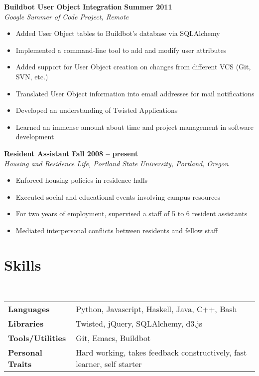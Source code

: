 \documentclass[margin,line]{resume}
\begin{document}
\begin{resume}
    \textbf{Buildbot User Object Integration} \hfill \textbf{Summer 2011} \vspace{2mm}\\\vspace{1mm}%
    \textsl{Google Summer of Code Project, Remote}
    \begin{itemize}
        \item Added User Object tables to Buildbot's database via SQLAlchemy
        \item Implemented a command-line tool to add and modify user attributes
        \item Added support for User Object creation on changes from different VCS (Git, SVN, etc.)
        \item Translated User Object information into email addresses for mail notifications
        \item Developed an understanding of Twisted Applications
        \item Learned an immense amount about time and project management in software development
    \end{itemize}

    \textbf{Resident Assistant} \hfill \textbf{Fall 2008 -- present} \vspace{2mm}\\\vspace{1mm}%
    \textsl{Housing and Residence Life, Portland State University, Portland, Oregon}
    \begin{itemize}
        \item Enforced housing policies in residence halls
        \item Executed social and educational events involving campus resources
        \item For two years of employment, supervised a staff of 5 to 6 resident assistants
        \item Mediated interpersonal conflicts between residents and fellow staff
    \end{itemize}

    \section{\mysidestyle Skills}

    \vspace{1mm}\\
    \begin{tabular}{@{}l|l}
        \textbf{Languages}       & Python, Javascript, Haskell, Java, C++, Bash\\[1mm]
        \textbf{Libraries}       & Twisted, jQuery, SQLAlchemy, d3.js\\[1mm]
        \textbf{Tools/Utilities} & Git, Emacs, Buildbot\\[1mm]
        \textbf{Personal Traits} & Hard working, takes feedback constructively, fast learner, self starter
    \end{tabular}


\end{resume}
\end{document}
